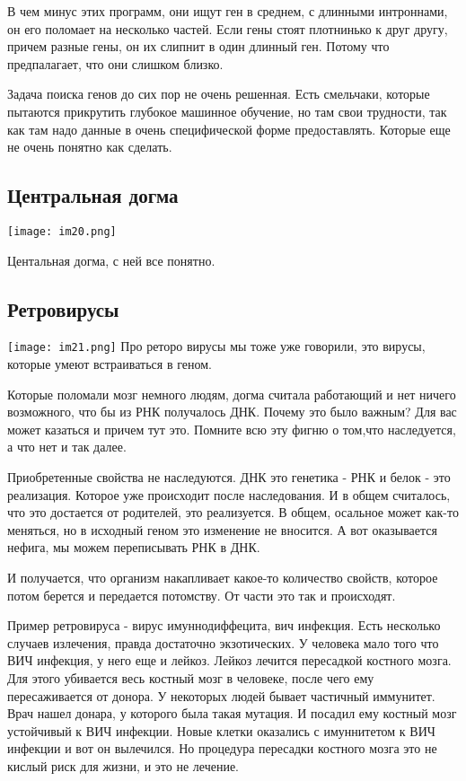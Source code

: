 В чем минус этих программ, они ищут ген в среднем, с длинными 
интроннами, он его поломает на несколько частей. Если гены 
стоят плотнинько к друг другу, причем разные гены, он 
их слипнит в один длинный ген. Потому что предпалагает, что они слишком близко. 

Задача поиска генов до сих пор не очень решенная. Есть смельчаки, 
которые пытаются прикрутить глубокое машинное обучение, но 
там свои трудности, так как там надо данные в очень специфической форме 
предоставлять. Которые еще не очень понятно как сделать. 

\subsection{Центральная догма}
\texttt{[image: im20.png]}

Центальная догма, с ней все понятно. 

\subsection{Ретровирусы}
\texttt{[image: im21.png]}
Про реторо вирусы мы тоже уже говорили, это вирусы, которые 
умеют встраиваться в геном. 

Которые поломали мозг немного людям, догма считала работающий и 
нет ничего возможного, что бы из РНК получалось ДНК. 
Почему это было важным? Для вас может казаться и причем тут это. 
Помните всю эту фигню о том,что наследуется, а что нет и так далее. 

Приобретенные свойства не наследуются. ДНК это генетика - РНК и белок - это 
реализация. Которое уже происходит после наследования. И в общем считалось, что 
это достается от родителей, это реализуется. В общем, осальное может как-то меняться, 
но в исходный геном это изменение не вносится. А вот оказывается нефига, 
мы можем переписывать РНК в ДНК. 

И получается, что организм накапливает какое-то количество свойств, 
которое потом берется и передается потомству. От части это так и происходят. 


Пример ретровируса - вирус имуннодиффецита, вич инфекция. Есть несколько 
случаев излечения, правда достаточно экзотических. У человека мало того что
ВИЧ инфекция, у него еще и лейкоз. Лейкоз лечится пересадкой костного мозга.
Для этого убивается весь костный мозг в человеке,
после чего ему пересаживается от донора. У некоторых
людей бывает частичный иммунитет. Врач нашел донара, у которого была такая
мутация. И посадил ему костный мозг устойчивый к ВИЧ инфекции. Новые клетки
оказались с имуннитетом к ВИЧ инфекции и вот он вылечился. Но процедура
пересадки костного мозга это не кислый риск для жизни, и это не лечение.

